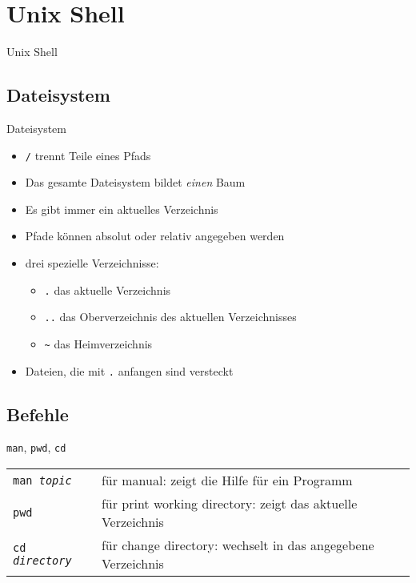 \section{Unix Shell}
\begin{frame}{Unix Shell}
  \tableofcontents[sectionstyle=show/hide,
                   hideothersubsections]
\end{frame}

\subsection{Dateisystem}
\begin{frame}{Dateisystem}
  \begin{itemize}
    \item \texttt{/} trennt Teile eines Pfads
    \item Das gesamte Dateisystem bildet \emph{einen} Baum
    \item Es gibt immer ein aktuelles Verzeichnis
    \item Pfade können absolut oder relativ angegeben werden
    \item drei spezielle Verzeichnisse:
      \begin{itemize}
        \item \texttt{.} das aktuelle Verzeichnis
        \item \texttt{..} das Oberverzeichnis des aktuellen Verzeichnisses
        \item \texttt{\textasciitilde} das Heimverzeichnis
      \end{itemize}
    \item Dateien, die mit \texttt{.} anfangen sind versteckt
  \end{itemize}
\end{frame}

\subsection{Befehle}
\begin{frame}{\texttt{man}, \texttt{pwd}, \texttt{cd}}
  \begin{tabular}{lp{20em}}
    \texttt{man \textit{topic}} & für manual: zeigt die Hilfe für ein Programm \\
    \texttt{pwd} & für print working directory: zeigt das aktuelle Verzeichnis \\
    \texttt{cd \textit{directory}} & für change directory: wechselt in das angegebene Verzeichnis
  \end{tabular}
\end{frame}

